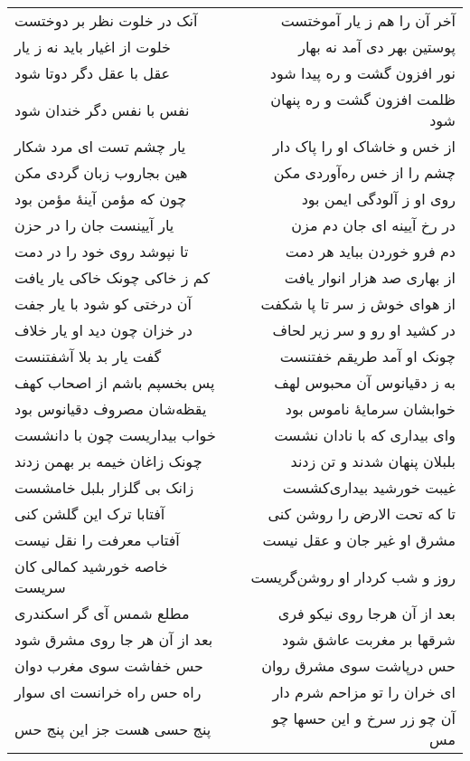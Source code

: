 \begin{center}
\begin{longtable}{l p{0.5cm} r}
\\
آنک در خلوت نظر بر دوختست
&&
آخر آن را هم ز یار آموختست
\\
خلوت از اغیار باید نه ز یار
&&
پوستین بهر دی آمد نه بهار
\\
عقل با عقل دگر دوتا شود
&&
نور افزون گشت و ره پیدا شود
\\
نفس با نفس دگر خندان شود
&&
ظلمت افزون گشت و ره پنهان شود
\\
یار چشم تست ای مرد شکار
&&
از خس و خاشاک او را پاک دار
\\
هین بجاروب زبان گردی مکن
&&
چشم را از خس ره‌آوردی مکن
\\
چون که مؤمن آینهٔ مؤمن بود
&&
روی او ز آلودگی ایمن بود
\\
یار آیینست جان را در حزن
&&
در رخ آیینه ای جان دم مزن
\\
تا نپوشد روی خود را در دمت
&&
دم فرو خوردن بباید هر دمت
\\
کم ز خاکی چونک خاکی یار یافت
&&
از بهاری صد هزار انوار یافت
\\
آن درختی کو شود با یار جفت
&&
از هوای خوش ز سر تا پا شکفت
\\
در خزان چون دید او یار خلاف
&&
در کشید او رو و سر زیر لحاف
\\
گفت یار بد بلا آشفتنست
&&
چونک او آمد طریقم خفتنست
\\
پس بخسپم باشم از اصحاب کهف
&&
به ز دقیانوس آن محبوس لهف
\\
یقظه‌شان مصروف دقیانوس بود
&&
خوابشان سرمایهٔ ناموس بود
\\
خواب بیداریست چون با دانشست
&&
وای بیداری که با نادان نشست
\\
چونک زاغان خیمه بر بهمن زدند
&&
بلبلان پنهان شدند و تن زدند
\\
زانک بی گلزار بلبل خامشست
&&
غیبت خورشید بیداری‌کشست
\\
آفتابا ترک این گلشن کنی
&&
تا که تحت الارض را روشن کنی
\\
آفتاب معرفت را نقل نیست
&&
مشرق او غیر جان و عقل نیست
\\
خاصه خورشید کمالی کان سریست
&&
روز و شب کردار او روشن‌گریست
\\
مطلع شمس آی گر اسکندری
&&
بعد از آن هرجا روی نیکو فری
\\
بعد از آن هر جا روی مشرق شود
&&
شرقها بر مغربت عاشق شود
\\
حس خفاشت سوی مغرب دوان
&&
حس درپاشت سوی مشرق روان
\\
راه حس راه خرانست ای سوار
&&
ای خران را تو مزاحم شرم دار
\\
پنج حسی هست جز این پنج حس
&&
آن چو زر سرخ و این حسها چو مس
\\

\end{longtable}
\end{center}
